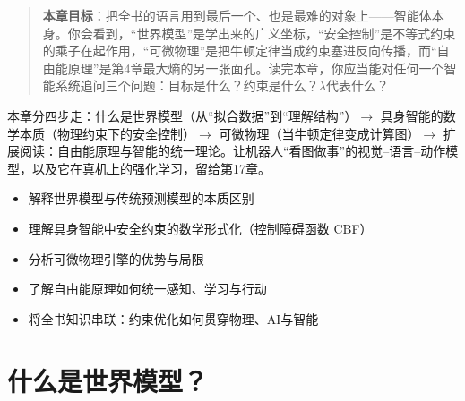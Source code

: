 \begin{quote}
\textbf{本章目标}：把全书的语言用到最后一个、也是最难的对象上——智能体本身。你会看到，“世界模型”是学出来的广义坐标，“安全控制”是不等式约束的乘子在起作用，“可微物理”是把牛顿定律当成约束塞进反向传播，而“自由能原理”是第4章最大熵的另一张面孔。读完本章，你应当能对任何一个智能系统追问三个问题：目标是什么？约束是什么？$\lambda$代表什么？
\end{quote}

本章分四步走：什么是世界模型（从“拟合数据”到“理解结构”）$\to$ 具身智能的数学本质（物理约束下的安全控制）$\to$ 可微物理（当牛顿定律变成计算图）$\to$ 扩展阅读：自由能原理与智能的统一理论。让机器人“看图做事”的视觉--语言--动作模型，以及它在真机上的强化学习，留给第17章。
\begin{tcolorbox}[colback=green!5, colframe=green!60!black, title=学完这章，你将能够...]
\begin{itemize}
    \item 解释世界模型与传统预测模型的本质区别
    \item 理解具身智能中安全约束的数学形式化（控制障碍函数 CBF）
    \item 分析可微物理引擎的优势与局限
    \item 了解自由能原理如何统一感知、学习与行动
    \item 将全书知识串联：约束优化如何贯穿物理、AI与智能
\end{itemize}
\end{tcolorbox}

\section{什么是世界模型？}

